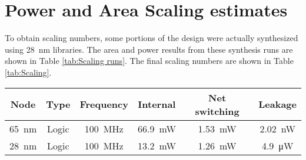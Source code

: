 \section{Power and Area Scaling estimates}
\label{sec:Power and Area Scaling estimates}

To obtain scaling numbers, some portions of the design were actually synthesized using \SI{28}{\nano\meter} libraries.
The area and power results from these synthesis runs are shown in Table \ref{tab:Scaling runs}.  The final scaling numbers are shown in Table \ref{tab:Scaling}.

\begin{table}[h]
  \centering
  \captionsetup{justification=centering}

  \begin{minipage}{1\textwidth}
    \centering
    \begin{minipage}{0.65\textwidth}
        \begin{adjustbox}{width=1\textwidth}
            \footnotesize
            \begin{tabular}{ |c|c|c|c|c|c|  }
              \hline
          Node  &   Type & Frequency                              & Internal                & Net switching           & Leakage                  \\
              \hline
          \SI{65}{\nano\meter}  &  Logic &\SI[per-mode=symbol]{100}{\mega\hertz}  & \SI{66.9}{\milli\watt} & \SI{1.53}{\milli\watt} & \SI{2.02}{\nano\watt}  \\  %
          \SI{28}{\nano\meter}  &  Logic &\SI[per-mode=symbol]{100}{\mega\hertz}  & \SI{13.2}{\milli\watt} & \SI{1.26}{\milli\watt} & \SI{4.9 }{\micro\watt} \\  %

\end{tabular}
\end{adjustbox}
\end{minipage}
\end{minipage}
\end{table}
